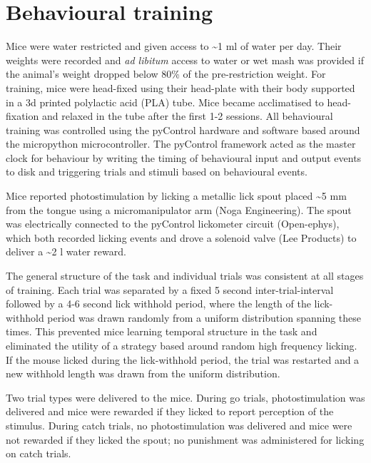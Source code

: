 \section{Behavioural training}

Mice were water restricted and given access to \textasciitilde1 ml of water per day. Their weights were recorded and \textit{ad libitum} access to water or wet mash was provided if the animal's weight dropped below 80\% of the pre-restriction weight. For training, mice were head-fixed using their head-plate with their body supported in a 3d printed polylactic acid (PLA) tube. Mice became acclimatised to head-fixation and relaxed in the tube after the first 1-2 sessions. All behavioural training was controlled using the pyControl hardware and software \cite{akam_pycontrol_2021} based around the micropython microcontroller. The pyControl framework acted as the master clock for behaviour by writing the timing of behavioural input and output events to disk and triggering trials and stimuli based on behavioural events.

Mice reported photostimulation by licking a metallic lick spout placed \textasciitilde5 mm from the tongue using a micromanipulator arm (Noga Engineering). The spout was electrically connected to the pyControl lickometer circuit (Open-ephys), which both recorded licking events and drove a solenoid valve (Lee Products) to deliver a \textasciitilde2 \textmu l water reward.

The general structure of the task and individual trials was consistent at all stages of training. Each trial was separated by a fixed 5 second inter-trial-interval followed by a 4-6 second lick withhold period, where the length of the lick-withhold period was drawn randomly from a uniform distribution spanning these times. This prevented mice learning temporal structure in the task and eliminated the utility of a strategy based around random high frequency licking. If the mouse licked during the lick-withhold period, the trial was restarted and a new withhold length was drawn from the uniform distribution. 

Two trial types were delivered to the mice. During go trials, photostimulation was delivered and mice were rewarded if they licked to report perception of the stimulus. During catch trials, no photostimulation was delivered and mice were not rewarded if they licked the spout; no punishment was administered for licking on catch trials. 

